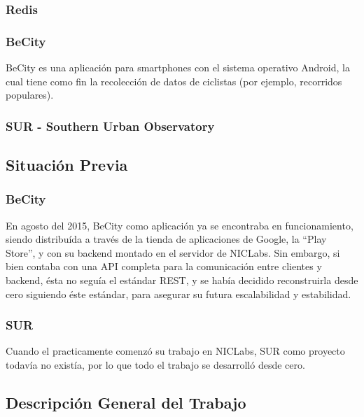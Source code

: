 \documentclass[11pt,letterpaper]{article}
\begin{document}
\subsubsection{Redis}



\subsubsection{BeCity}

BeCity es una aplicación para smartphones con el sistema operativo Android, la cual tiene como fin la recolección de datos de ciclistas (por ejemplo, recorridos populares).

\subsubsection{SUR - Southern Urban Observatory}

\subsection{Situación Previa}
\subsubsection{BeCity}

En agosto del 2015, BeCity como aplicación ya se encontraba en funcionamiento, siendo distribuída a través de la tienda de aplicaciones de Google, la ``Play Store'', y con su backend montado en el servidor de NICLabs. Sin embargo, si bien contaba con una API completa para la comunicación entre clientes y backend, ésta no seguía el estándar REST, y se había decidido reconstruirla desde cero siguiendo éste estándar, para asegurar su futura escalabilidad y estabilidad.

\subsubsection{SUR}

Cuando el practicamente comenzó su trabajo en NICLabs, SUR como proyecto todavía no existía, por lo que todo el trabajo se desarrolló desde cero.

\subsection{Descripción General del Trabajo}
\end{document}
